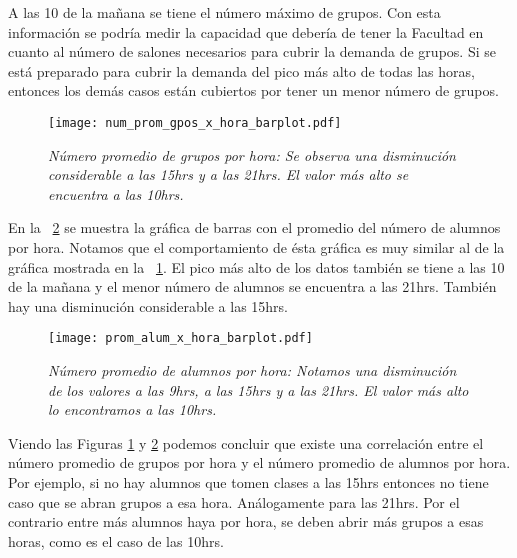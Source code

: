 
A las 10 de la mañana se tiene el número máximo de grupos. Con esta información se podría medir la capacidad que debería de tener la Facultad en cuanto al número de salones necesarios para cubrir la demanda de grupos. Si se está preparado para cubrir la demanda del pico más alto de todas las horas, entonces los demás casos están cubiertos por tener un menor número de grupos.


\begin{figure}[H]
\centering
\texttt{[image: num\_prom\_gpos\_x\_hora\_barplot.pdf]} %
\caption[\textit{Número promedio de grupos por hora}]{\textit{Número promedio de grupos por hora: Se observa una disminución considerable a las 15hrs y a las 21hrs. El valor más alto se encuentra a las 10hrs.}}\label{num_prom_gpos_x_hora_barplot}
\end{figure}

En la \figurename{~\ref{prom_alum_x_hora_barplot}} se muestra la gráfica de barras con el promedio del número de alumnos por hora. Notamos que el comportamiento de ésta gráfica es muy similar al de la gráfica mostrada en la \figurename{~\ref{num_prom_gpos_x_hora_barplot}}. El pico más alto de los datos también se tiene a las 10 de la mañana y el menor número de alumnos se encuentra a las 21hrs. También hay una disminución considerable a las 15hrs.

\begin{figure}[H]
\centering
\texttt{[image: prom\_alum\_x\_hora\_barplot.pdf]} %
\caption[\textit{Número promedio de alumnos por hora}]{\textit{Número promedio de alumnos por hora: Notamos una disminución de los valores a las 9hrs, a las 15hrs y a las 21hrs. El valor más alto lo encontramos a las 10hrs.}}\label{prom_alum_x_hora_barplot}
\end{figure}

Viendo las Figuras \ref{num_prom_gpos_x_hora_barplot} y \ref{prom_alum_x_hora_barplot} podemos concluir que existe una correlación entre el número promedio de grupos por hora y el número promedio de alumnos por hora. Por ejemplo, si no hay alumnos que tomen clases a las 15hrs entonces no tiene caso que se abran grupos a esa hora. Análogamente para las 21hrs. Por el contrario entre más alumnos haya por hora, se deben abrir más grupos a esas horas, como es el caso de las 10hrs.
